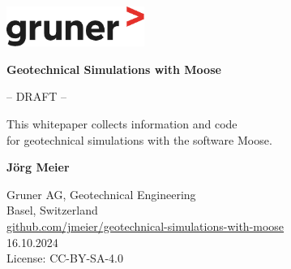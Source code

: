 \begin{titlepage}
    \begin{flushright}
        \includegraphics[width=4.5cm]{img/gruner.pdf}
    \end{flushright}
    \begin{center}
        \vspace*{5cm}

        {\Huge\textbf{Geotechnical Simulations with Moose}}

        \vspace{5cm}

        \large{-- DRAFT --}

        \vfill

        \large{This whitepaper collects information and code \\
            for geotechnical simulations with the software Moose.}

        \vfill

        \textbf{Jörg Meier}

        \vspace{0.8cm}

        Gruner AG, Geotechnical Engineering\\
        Basel, Switzerland\\

        \vspace{1cm}
        \href{https://github.com/jmeier/geotechnical-simulations-with-moose}{github.com/jmeier/geotechnical-simulations-with-moose}\\
        16.10.2024\\

        \vspace{1cm}
        License: CC-BY-SA-4.0

    \end{center}
\end{titlepage}
